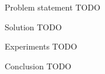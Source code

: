 \documentclass{beamer}
\begin{document}
\begin{frame}{Problem statement}
TODO
\end{frame}
\begin{frame}{Solution}
TODO
\end{frame}
\begin{frame}{Experiments}
TODO
\end{frame}
\begin{frame}{Conclusion}
TODO
\end{frame}
\end{document}
